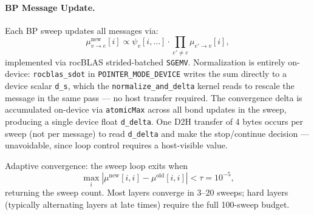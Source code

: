 \documentclass[11pt]{article}
\begin{document}
\paragraph{BP Message Update.}
Each BP sweep updates all messages via:
\begin{equation}
  \mu_{v \to e}^{\text{new}}[i] \propto
    \psi_v[i, \ldots] \cdot \prod_{e' \neq e} \mu_{e' \to v}[i],
  \label{eq:bp}
\end{equation}
implemented via rocBLAS strided-batched \texttt{SGEMV}.
Normalization is entirely on-device: \texttt{rocblas\_sdot} in
\texttt{POINTER\_MODE\_DEVICE} writes the sum directly to a device scalar
\texttt{d\_s}, which the \texttt{normalize\_and\_delta} kernel reads to rescale
the message in the same pass --- no host transfer required.
The convergence delta is accumulated on-device via \texttt{atomicMax} across
all bond updates in the sweep, producing a single device float \texttt{d\_delta}.
One D2H transfer of 4 bytes occurs per sweep (not per message) to read
\texttt{d\_delta} and make the stop/continue decision --- unavoidable, since
loop control requires a host-visible value.

Adaptive convergence: the sweep loop exits when
\begin{equation}
  \max_i |\mu^{\text{new}}[i,i] - \mu^{\text{old}}[i,i]| < \tau = 10^{-5},
  \label{eq:bp_tol}
\end{equation}
returning the sweep count. Most layers converge in 3--20 sweeps; hard layers
(typically alternating layers at late times) require the full 100-sweep budget.
\end{document}
